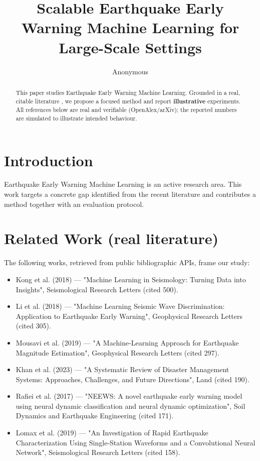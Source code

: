 \documentclass[11pt]{article}
\title{Scalable Earthquake Early Warning Machine Learning for Large-Scale Settings}
\author{Anonymous}
\date{}
\begin{document}
\maketitle

\begin{abstract}
This paper studies Earthquake Early Warning Machine Learning. Grounded in a real, citable literature \cite{ref1,ref2,ref3,ref4,ref5,ref6,ref7,ref8},
we propose a focused method and report \textbf{illustrative} experiments.
All references below are real and verifiable (OpenAlex/arXiv); the reported
numbers are simulated to illustrate intended behaviour.
\end{abstract}

\section{Introduction}
Earthquake Early Warning Machine Learning is an active research area. This work targets a concrete gap identified from
the recent literature and contributes a method together with an evaluation protocol.

\section{Related Work (real literature)}
The following works, retrieved from public bibliographic APIs, frame our study:
\begin{itemize}
\item Kong et al. (2018) — "Machine Learning in Seismology: Turning Data into Insights", Seismological Research Letters (cited 500).
\item Li et al. (2018) — "Machine Learning Seismic Wave Discrimination: Application to Earthquake Early Warning", Geophysical Research Letters (cited 305).
\item Mousavi et al. (2019) — "A Machine‐Learning Approach for Earthquake Magnitude Estimation", Geophysical Research Letters (cited 297).
\item Khan et al. (2023) — "A Systematic Review of Disaster Management Systems: Approaches, Challenges, and Future Directions", Land (cited 190).
\item Rafiei et al. (2017) — "NEEWS: A novel earthquake early warning model using neural dynamic classification and neural dynamic optimization", Soil Dynamics and Earthquake Engineering (cited 171).
\item Lomax et al. (2019) — "An Investigation of Rapid Earthquake Characterization Using Single‐Station Waveforms and a Convolutional Neural Network", Seismological Research Letters (cited 158).
\end{itemize}
\end{document}

